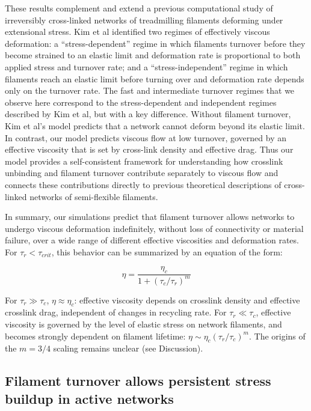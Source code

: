\documentclass[10pt,letterpaper]{article}
\begin{document}
These results complement and extend a previous computational study of irreversibly cross-linked networks of treadmilling filaments deforming under extensional stress\cite{Kim2014526}. Kim et al identified two regimes of effectively viscous deformation: a ``stress-dependent'' regime in which filaments turnover before they become strained to an elastic limit and deformation rate is proportional to both applied stress and turnover rate; and a ``stress-independent'' regime in which filaments reach an elastic limit before turning over and deformation rate depends only on the turnover rate. The fast and intermediate turnover regimes that we observe here correspond to the stress-dependent and independent regimes described by Kim et al, but with a key difference. Without filament turnover, Kim et al's model predicts that a network cannot deform beyond its elastic limit.  In contrast, our model predicts viscous flow at low turnover, governed by an effective viscosity that is set by cross-link density and effective drag. Thus our model provides a self-consistent framework for understanding how crosslink unbinding and filament turnover contribute separately to viscous flow and connects these contributions directly to previous theoretical descriptions of cross-linked networks of semi-flexible filaments. 

In summary, our simulations predict that filament turnover allows networks to undergo viscous deformation indefinitely, without loss of connectivity or material failure, over a wide range of different effective viscosities and deformation rates. For $\tau_r < \tau_{crit}$, this behavior can be summarized by an equation of the form:

\begin{equation}
\label{eqn:simple_eta}
\eta = \frac{\eta_c}{1+(\tau_c/\tau_r)^m}  
\end{equation}

For $\tau_r \gg \tau_c$, $\eta\approx\eta_c$: effective viscosity depends on crosslink density and effective crosslink drag, independent of changes in recycling rate. For $\tau_r\ll\tau_c$,  effective viscosity is governed by the level of elastic stress on network filaments, and becomes strongly dependent on filament lifetime: $\eta\sim\eta_c(\tau_r/\tau_c)^m$. The origins of the $m = 3/4$ scaling remains unclear (see Discussion).




\subsection*{Filament turnover allows persistent stress buildup in active networks}
\end{document}
